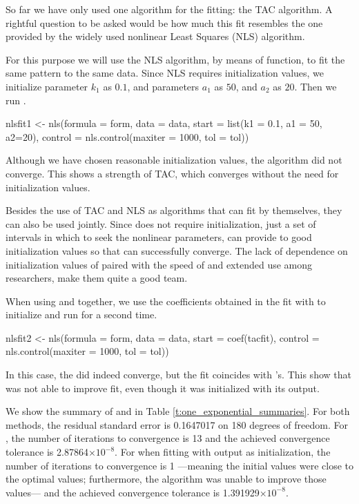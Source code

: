 So far we have only used one algorithm for the fitting: the TAC algorithm. A rightful question to be asked would be how much this fit resembles the one provided by the widely used nonlinear Least Squares (NLS) algorithm. 

For this purpose we will use the NLS algorithm, by means of  function, to fit the same pattern to the same data. Since NLS requires initialization values, we initialize parameter $k_1$ as $0.1$, and parameters $a_1$ as $50$, and $a_2$ as $20$. Then we run .
\begin{example}
    nlsfit1 <- nls(formula = form, data = data, start = list(k1 = 0.1, a1 = 50, a2=20),
    control = nls.control(maxiter = 1000, tol = tol))
\end{example}
Although we have chosen reasonable initialization values, the algorithm did not converge. This shows a strength of TAC, which converges without the need for initialization values.

Besides the use of TAC and NLS as algorithms that can fit by themselves, they can also be used jointly. Since  does not require initialization, just a set of intervals in which to seek the nonlinear parameters,  can provide to  good initialization values so that  can successfully converge. The lack of dependence on initialization values of  paired with the speed of  and extended use among researchers, make them quite a good team.

When using  and  together, we use the coefficients obtained in the fit with  to initialize and run  for a second time.
\begin{example}
  nlsfit2 <- nls(formula = form, data = data, start = coef(tacfit), 
  control = nls.control(maxiter = 1000, tol = tol))
\end{example}
In this case, the  did indeed converge, but the fit coincides with 's. This show that  was not able to improve  fit, even though it was initialized with its output.

We show the summary of  and  in Table  \ref{t:one_exponential_summaries}. For both methods, the residual standard error is 0.1647017 on 180 degrees of freedom. For , the number of iterations to convergence is 13 and the achieved convergence tolerance is 2.87864$\times 10^{-8}$. For  when fitting with  output as initialization, the number of iterations to convergence is 1 ---meaning the initial values were close to the optimal values; furthermore, the algorithm was unable to improve those values--- and the achieved convergence tolerance is 1.391929$\times 10^{-8}$. 



